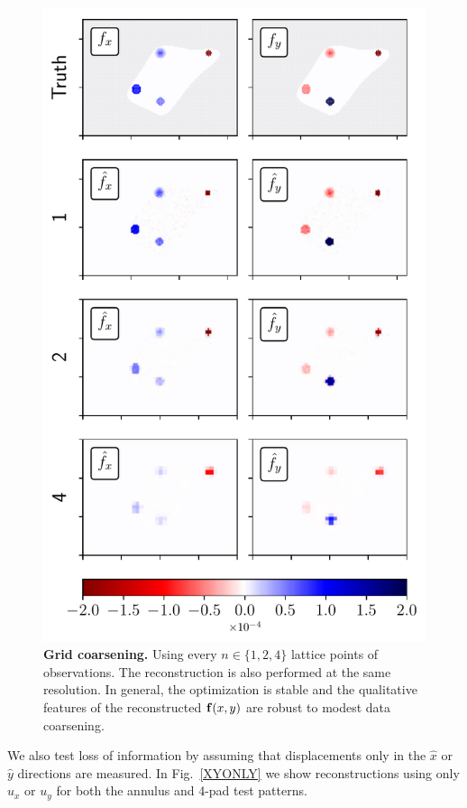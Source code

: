 \documentclass[aps,prl,reprint,twocolumn,groupedaddress,showpacs]{revtex4}
\def\f{{\bf f}}
\begin{document}
\begin{figure}
\includegraphics[width=\linewidth]{fig4}
\caption{\textbf{Grid coarsening.} Using every $n\in\{1,2,4\}$
  lattice points of observations. The reconstruction is also performed
  at the same resolution.  In general, the optimization is stable and
  the qualitative features of the reconstructed $\f(x,y)$ are robust
  to modest data coarsening.}
\label{GRID}
\end{figure}

We also test loss of information by assuming that 
displacements only in the $\hat{x}$ or $\hat{y}$ directions 
are measured. In Fig.~\ref{XYONLY} we show reconstructions using only 
$u_{x}$ or $u_{y}$ for both the annulus and 4-pad test patterns.
\end{document}
